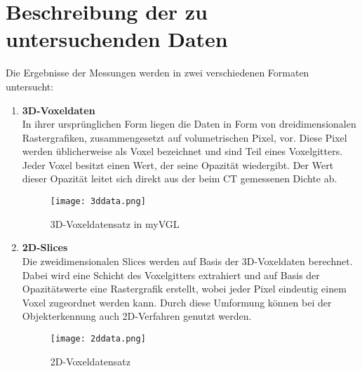 
\chapter{Beschreibung der zu untersuchenden Daten}
Die Ergebnisse der Messungen werden in zwei verschiedenen Formaten untersucht:

\begin{enumerate}
\item \textbf{3D-Voxeldaten} \\
In ihrer ursprünglichen Form liegen die Daten in Form von dreidimensionalen Rastergrafiken, zusammengesetzt auf volumetrischen Pixel, vor. Diese Pixel werden üblicherweise als Voxel bezeichnet und sind Teil eines Voxelgitters. Jeder Voxel besitzt einen Wert, der seine Opazität wiedergibt. Der Wert dieser Opazität leitet sich direkt aus der beim CT gemessenen Dichte ab.

\begin{figure}[H]
  \begin{center}
    \texttt{[image: 3ddata.png]}
    \caption{3D-Voxeldatensatz in myVGL}
    \label{fig:3ddata1}
  \end{center}
\end{figure}

\item \textbf{2D-Slices} \\
Die zweidimensionalen Slices werden auf Basis der 3D-Voxeldaten berechnet. Dabei wird eine Schicht des Voxelgitters extrahiert und auf Basis der Opazitätswerte eine Rastergrafik erstellt, wobei jeder Pixel eindeutig einem Voxel zugeordnet werden kann. Durch diese Umformung können bei der Objekterkennung auch 2D-Verfahren genutzt werden.

\begin{figure}[H]
  \begin{center}
    \texttt{[image: 2ddata.png]}
    \caption{2D-Voxeldatensatz}
    \label{fig:3ddata1}
  \end{center}
\end{figure}

\end{enumerate}
